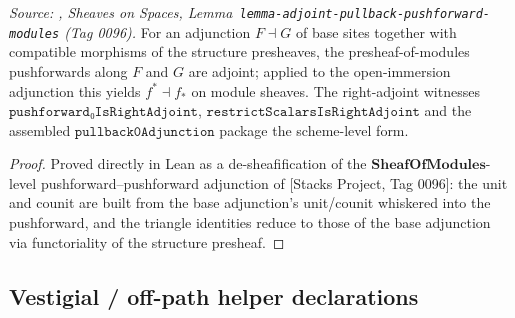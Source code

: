 \begin{lemma}
  \label{lem:pushforward_adjunction}
  \textit{Source: \cite{stacks-project}, Sheaves on Spaces,
  Lemma~\texttt{lemma-adjoint-pullback-pushforward-modules} (Tag 0096).}
  For an adjunction \(F \dashv G\) of base sites together with compatible morphisms of the
  structure presheaves, the presheaf-of-modules pushforwards along \(F\) and \(G\) are
  adjoint; applied to the open-immersion adjunction this yields \(f^{*} \dashv f_{*}\) on
  module sheaves. The right-adjoint witnesses \(\mathtt{pushforward₀IsRightAdjoint}\),
  \(\mathtt{restrictScalarsIsRightAdjoint}\) and the assembled
  \(\mathtt{pullback0Adjunction}\) package the scheme-level form.
\end{lemma}
\begin{proof}
  Proved directly in Lean as a de-sheafification of the \(\mathbf{SheafOfModules}\)-level
  pushforward--pushforward adjunction of [Stacks Project, Tag 0096]: the unit and counit
  are built from the base adjunction's unit/counit whiskered into the pushforward, and
  the triangle identities reduce to those of the base adjunction via functoriality of the
  structure presheaf.
\end{proof}

\subsection{Vestigial / off-path helper declarations}
\label{subsec:tensorobj_vestigial_helpers}

